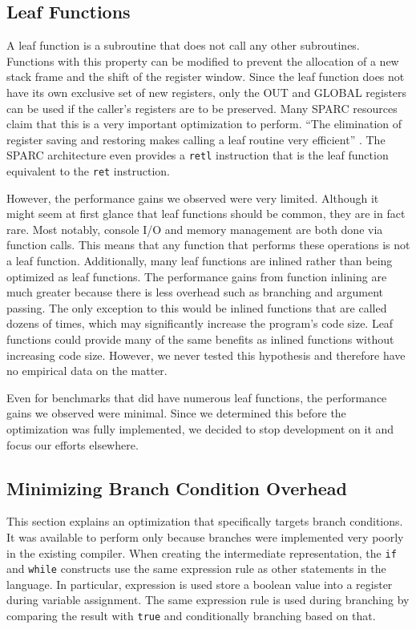 \documentclass[12pt]{article}
\begin{document}
\subsection{Leaf Functions}
A leaf function is a subroutine that does not call any other subroutines.
Functions with this property can be modified to prevent the allocation of a new stack frame and the shift of the register window.
Since the leaf function does not have its own exclusive set of new registers, only the OUT and GLOBAL registers can be used if the caller's registers are to be preserved.
Many SPARC resources claim that this is a very important optimization to perform.
``The elimination of register saving and restoring makes calling a leaf routine very efficient'' \cite{sparcArchitecture}.
The SPARC architecture even provides a {\tt retl} instruction that is the leaf function equivalent to the {\tt ret} instruction.

However, the performance gains we observed were very limited.
Although it might seem at first glance that leaf functions should be common, they are in fact rare.
Most notably, console I/O and memory management are both done via function calls.
This means that any function that performs these operations is not a leaf function.
Additionally, many leaf functions are inlined rather than being optimized as leaf functions.
The performance gains from function inlining are much greater because there is less overhead such as branching and argument passing.
The only exception to this would be inlined functions that are called dozens of times, which may significantly increase the program's code size.
Leaf functions could provide many of the same benefits as inlined functions without increasing code size.
However, we never tested this hypothesis and therefore have no empirical data on the matter.

Even for benchmarks that did have numerous leaf functions, the performance gains we observed were minimal.
Since we determined this before the optimization was fully implemented, we decided to stop development on it and focus our efforts elsewhere.

\subsection{Minimizing Branch Condition Overhead}
This section explains an optimization that specifically targets branch conditions.
It was available to perform only because branches were implemented very poorly in the existing compiler.
When creating the intermediate representation, the {\tt if} and {\tt while} constructs use the same expression rule as other statements in the language.
In particular, expression is used store a boolean value into a register during variable assignment.
The same expression rule is used during branching by comparing the result with {\tt true} and conditionally branching based on that.
\end{document}
